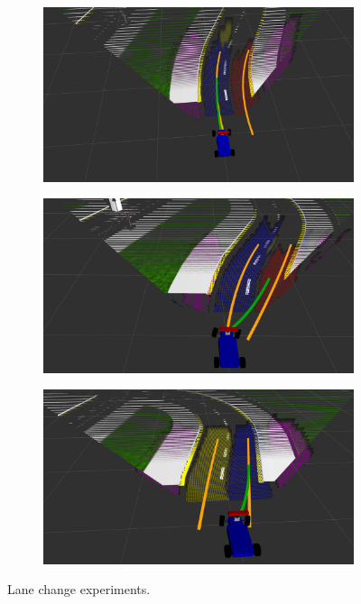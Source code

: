 \begin{figure}[h]
\begin{subfigure}[b]{0.45\linewidth}
  \end{subfigure}
  \begin{subfigure}[b]{0.45\linewidth}
    \includegraphics[width=\linewidth]{figures/experiments/overtaking2-pc.png}
  \end{subfigure}
  \begin{subfigure}[b]{0.45\linewidth}
    \includegraphics[width=\linewidth]{figures/experiments/overtaking3-pc.png}
  \end{subfigure}
  \begin{subfigure}[b]{0.45\linewidth}
    \includegraphics[width=\linewidth]{figures/experiments/overtaking4-pc.png}
  \end{subfigure}
  \caption{Lane change experiments.}
  \label{figure:lane-change}
\end{figure}


